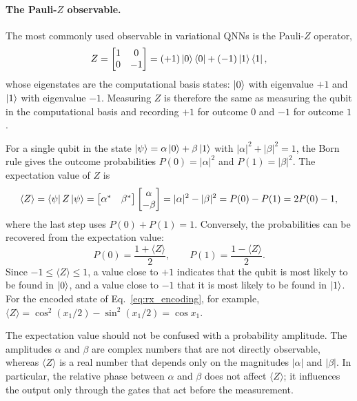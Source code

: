\documentclass[12pt]{article}
\numberwithin{equation}{section}  %
\begin{document}
\paragraph{The Pauli-$Z$ observable.} The most commonly used observable in variational QNNs is the Pauli-$Z$ operator,
\begin{equation}
Z = \begin{bmatrix} 1 & 0 \\ 0 & -1 \end{bmatrix} = (+1)\ket{0}\bra{0} + (-1)\ket{1}\bra{1},
\end{equation}
whose eigenstates are the computational basis states: $\ket{0}$ with eigenvalue $+1$ and $\ket{1}$ with eigenvalue $-1$. Measuring $Z$ is therefore the same as measuring the qubit in the computational basis and recording $+1$ for outcome $0$ and $-1$ for outcome $1$.

For a single qubit in the state $\ket{\psi} = \alpha\ket{0} + \beta\ket{1}$ with $|\alpha|^2 + |\beta|^2 = 1$, the Born rule gives the outcome probabilities $P(0) = |\alpha|^2$ and $P(1) = |\beta|^2$. The expectation value of $Z$ is
\begin{equation}
\langle Z \rangle = \bra{\psi} Z \ket{\psi}
= \begin{bmatrix} \alpha^* & \beta^* \end{bmatrix}
\begin{bmatrix} \alpha \\ -\beta \end{bmatrix}
= |\alpha|^2 - |\beta|^2
= P(0) - P(1)
= 2P(0) - 1,
\label{eq:z_expectation}
\end{equation}
where the last step uses $P(0) + P(1) = 1$. Conversely, the probabilities can be recovered from the expectation value:
\begin{equation}
P(0) = \frac{1 + \langle Z \rangle}{2}, \qquad P(1) = \frac{1 - \langle Z \rangle}{2}.
\end{equation}
Since $-1 \leq \langle Z \rangle \leq 1$, a value close to $+1$ indicates that the qubit is most likely to be found in $\ket{0}$, and a value close to $-1$ that it is most likely to be found in $\ket{1}$. For the encoded state of Eq.~\eqref{eq:rx_encoding}, for example, $\langle Z \rangle = \cos^2(x_1/2) - \sin^2(x_1/2) = \cos x_1$.

The expectation value should not be confused with a probability amplitude. The amplitudes $\alpha$ and $\beta$ are complex numbers that are not directly observable, whereas $\langle Z \rangle$ is a real number that depends only on the magnitudes $|\alpha|$ and $|\beta|$. In particular, the relative phase between $\alpha$ and $\beta$ does not affect $\langle Z \rangle$; it influences the output only through the gates that act before the measurement.
\end{document}
